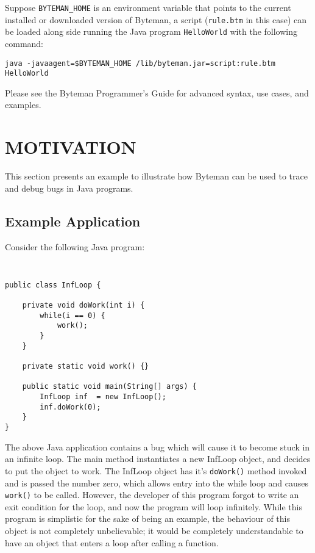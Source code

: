 \documentclass[letterpaper,twocolumn,10pt]{article}
\begin{document}
Suppose {\tt BYTEMAN\_HOME} is an environment variable that points to the current installed or downloaded version of Byteman, a script ({\tt rule.btm} in this case) can be loaded along side running the Java program {\tt HelloWorld} with the following command:

\begin{center}
\noindent
{\tt java -javaagent=\$BYTEMAN\_HOME
/lib/byteman.jar=script:rule.btm HelloWorld}
\end{center}

\noindent
Please see the Byteman Programmer's Guide\cite{bytemanguide} for advanced syntax, use cases, and examples.


\section{MOTIVATION}

This section presents an example to illustrate how Byteman can be used to trace and debug bugs in Java programs.

\subsection{Example Application}

Consider the following Java program:
{\tt \small
\begin{verbatim}
public class InfLoop {

    private void doWork(int i) {
        while(i == 0) {
            work();
        }
    }

    private static void work() {}

    public static void main(String[] args) { 
        InfLoop inf  = new InfLoop();
        inf.doWork(0);
    }
}
\end{verbatim}
}

The above Java application contains a bug which will cause it to become stuck in an infinite loop. The main method instantiates a new InfLoop object, and decides to put the object to work. The InfLoop object has it's {\tt doWork()} method invoked and is passed the number zero, which allows entry into the while loop and causes {\tt work()} to be called. However, the developer of this program forgot to write an exit condition for the loop, and now the program will loop infinitely. While this program is simplistic for the sake of being an example, the behaviour of this object is not completely unbelievable; it would be completely understandable to have an object that enters a loop after calling a function.
\end{document}
